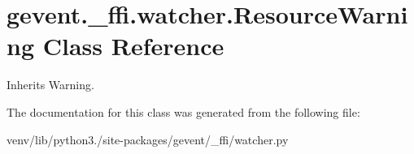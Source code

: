 \hypertarget{classgevent_1_1__ffi_1_1watcher_1_1_resource_warning}{}\section{gevent.\+\_\+ffi.\+watcher.\+Resource\+Warning Class Reference}
\label{classgevent_1_1__ffi_1_1watcher_1_1_resource_warning}


Inherits Warning.



The documentation for this class was generated from the following file\+:\begin{DoxyCompactItemize}
\item 
venv/lib/python3./site-\/packages/gevent/\+\_\+ffi/watcher.\+py\end{DoxyCompactItemize}

